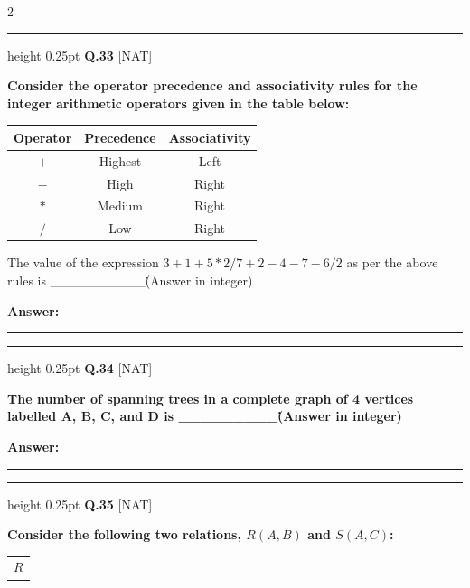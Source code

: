 \documentclass[a4paper,10pt,twoside]{article}
\begin{document}
\begin{multicols}{2}
\par\vspace{6pt}\hrule height 0.25pt\vspace{6pt}
\noindent\textbf{Q.33} \hfill {\footnotesize\textsf{[NAT]}}
\par\vspace{2pt}
{\bfseries Consider the operator precedence and associativity rules for the integer arithmetic operators given in the table below:
\begin{center}
\begin{tabular}{|c|c|c|}
\hline
\textbf{Operator} & \textbf{Precedence} & \textbf{Associativity} \\
\hline
$+$ & Highest & Left \\
$-$ & High & Right \\
$*$ & Medium & Right \\
$/$ & Low & Right \\
\hline
\end{tabular}
\end{center}
The value of the expression $3 + 1 + 5 * 2 / 7 + 2 - 4 - 7 - 6 / 2$ as per the above rules is \_\_\_\_\_\_\_\_\_\_\. (Answer in integer) \par}
\par\vspace{3pt}\noindent\textbf{Answer:} \rule{3.2cm}{0.4pt}
\par\vspace{6pt}\hrule height 0.25pt\vspace{6pt}
\noindent\textbf{Q.34} \hfill {\footnotesize\textsf{[NAT]}}
\par\vspace{2pt}
{\bfseries The number of spanning trees in a complete graph of 4 vertices labelled A, B, C, and D is \_\_\_\_\_\_\_\_\_\. (Answer in integer) \par}
\par\vspace{3pt}\noindent\textbf{Answer:} \rule{3.2cm}{0.4pt}
\par\vspace{6pt}\hrule height 0.25pt\vspace{6pt}
\noindent\textbf{Q.35} \hfill {\footnotesize\textsf{[NAT]}}
\par\vspace{2pt}
{\bfseries Consider the following two relations, $R(A,B)$ and $S(A,C)$:
\begin{center}
\begin{tabular}{|c|c|}
\multicolumn{2}{c}{$R$} \\

\end{tabular}
\end{center}}
\end{multicols}
\end{document}

